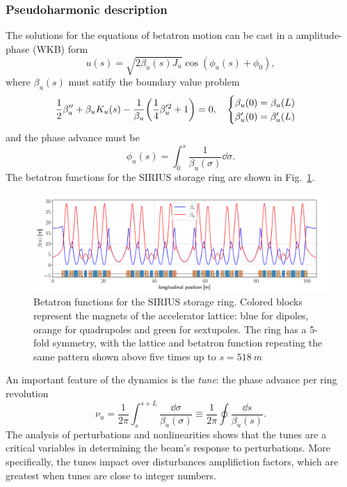 \subsubsection{Pseudoharmonic description}
The solutions for the equations of betatron motion can be cast in a amplitude-phase (WKB) form
\begin{equation}
    u(s) = \sqrt{2\beta_u(s) J_u}\cos(\phi_u(s) + \phi_0),
    \label{eq:pseudo_harmon}
\end{equation}
where $\beta_u(s)$ must satify the boundary value problem
\begin{equation}
    \frac{1}{2}\beta_{u}^{\prime\prime}+\beta_{u} K_u(s) - \frac{1}{\beta_{u}}\qty(\frac{1}{4}\beta_{u}^{\prime 2} + 1 ) = 0, \quad
        \begin{cases}
            \beta_{u}(0) = \beta_{u}(L)\\ \beta_{u}^{\prime}(0) = \beta_{u}^{\prime}(L)
        \end{cases}
    \label{eq:beta_eq}
\end{equation}
and the phase advance must be
    \begin{equation}
        \phi_u(s) = \int_{0}^{s}\frac{1}{\beta_u(\sigma)}\dd\sigma.
   \end{equation}
The betatron functions for the SIRIUS storage ring are shown in Fig.~\ref{betafunc}.
\begin{figure}[htb]
    \centering
    \includegraphics[width=\textwidth]{Images/beta_functions.pdf}
    \caption{Betatron functions for the SIRIUS storage ring. Colored blocks represent the magnets of the accelerator lattice: blue for dipoles, orange for quadrupoles and green for sextupoles. The ring has a 5-fold symmetry, with the lattice and betatron function repeating the same pattern shown above five times up to $s=518~\unit{m}$}
    \label{betafunc}
\end{figure}

An important feature of the dynamics is the \textit{tune}: the phase advance per ring revolution
\begin{equation*}
    \nu_u=\frac{1}{2\pi}\int_{s}^{s+L}\frac{\dd \sigma}{\beta_u(\sigma)}\equiv\frac{1}{2\pi}\oint\frac{\dd s}{\beta_u(s)}.
\end{equation*}
The analysis of perturbations and nonlinearities shows that the tunes are a critical variables in determining the beam's response to perturbations. More specifically, the tunes impact over disturbances amplifiction factors, which are greatest when tunes are close to integer numbers.

